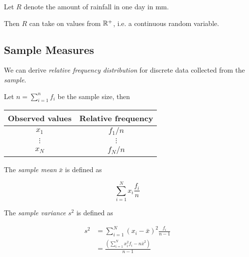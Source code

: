 \begin{example}[Rainfall]
    Let $R$ denote the amount of rainfall in one day in mm.
    
    Then $R$ can take on values from $\mathbb{R}^{+}$, i.e. a continuous random variable.
\end{example}

\subsection{Sample Measures}

\begin{definition}
    We can derive \textit{relative frequency distribution} for discrete data collected from the \textit{sample}.
    
    Let $n = \sum \limits_{i = 1}^{n} f_i$ be the sample size, then
    
    \begin{center}
        \begin{tabular}{c|c}
            Observed values & Relative frequency \\
            \hline
            $x_1$ & $f_1 / n$ \\
            $\vdots$ & $\vdots$ \\
            $x_N$ & $f_N / n$ \\
        \end{tabular}
    \end{center}
\end{definition}

\begin{definition}
    The \textit{sample mean} $\bar{x}$ is defined as

    \begin{equation}
        \sum \limits_{i=1}^{N} x_i \frac{f_i}{n}        
    \end{equation}
\end{definition}

\begin{definition}
    The \textit{sample variance} $s^2$ is defined as
    
    \begin{align}
        s^2
        &= \sum \limits_{i=1}^{N} \left( x_i - \bar{x} \right)^2 \frac{f_i}{n - 1} \\
        &= \frac{\left( \sum \limits_{i=1}^{N} x_i^2 f_i - n \bar{x}^2 \right)}{n - 1}
    \end{align}
\end{definition}

